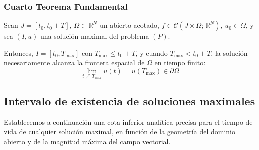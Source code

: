 \subsubsection{Cuarto Teorema Fundamental}

\begin{teorema}
    Sean $J = [t_0, t_0 + T]$, $\Omega \subset \mathbb{R}^N$ un abierto acotado, $f \in \mathcal{C}(J \times \overline{\Omega}; \, \mathbb{R}^N)$, $u_0 \in \Omega$, y sea $(I, u)$ una solución maximal del problema $(P)$.
    
    Entonces, $I = [t_0, T_{\max}]$ con $T_{\max} \leq t_0 + T$, y cuando $T_{\max} < t_0 + T$, la solución necesariamente alcanza la frontera espacial de $\Omega$ en tiempo finito:
    \[
        \lim_{t \nearrow T_{\max}} u(t) = u(T_{\max}) \in \partial \Omega
    \]
\end{teorema}

\begin{center}
\end{center}

\subsection{Intervalo de existencia de soluciones maximales}

Establecemos a continuación una cota inferior analítica precisa para el tiempo de vida de cualquier solución maximal, en función de la geometría del dominio abierto y de la magnitud máxima del campo vectorial.

